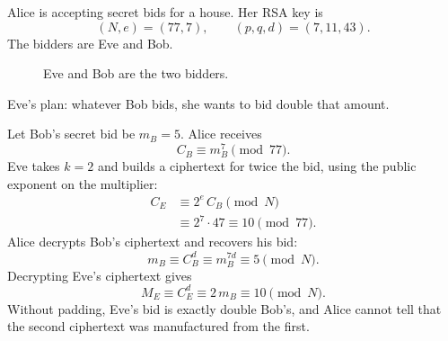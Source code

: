 
\begin{example}
Alice is accepting secret bids for a house. Her RSA key is
\[
    (N,e)=(77,7),
    \qquad
    (p,q,d)=(7,11,43).
\]
The bidders are Eve and Bob.

\begin{figure}[H]
\centering
{}
\caption{Eve and Bob are the two bidders.}
\end{figure}

Eve's plan: whatever Bob bids, she wants to bid double that amount.

Let Bob's secret bid be $m_{B}=5$. Alice receives
\[
    C_{B}\equiv m_{B}^{7}\pmod{77}.
\]
\begingroup\samepage
Eve takes $k=2$ and builds a ciphertext for twice the bid, using the
public exponent on the multiplier:
\begin{align*}
    C_{E}
    &\equiv 2^{e}\,C_{B}\pmod{N}\\
    &\equiv 2^{7}\cdot 47
     \equiv 10\pmod{77}.
\end{align*}
\endgroup
Alice decrypts Bob's ciphertext and recovers his bid:
\[
    m_{B}
    \equiv C_{B}^{d}
    \equiv m_{B}^{7d}
    \equiv 5\pmod{N}.
\]
Decrypting Eve's ciphertext gives
\[
    M_{E}
    \equiv C_{E}^{d}
    \equiv 2\,m_{B}
    \equiv 10\pmod{N}.
\]
Without padding, Eve's bid is exactly double Bob's, and Alice cannot tell
that the second ciphertext was manufactured from the first.


\end{example}
